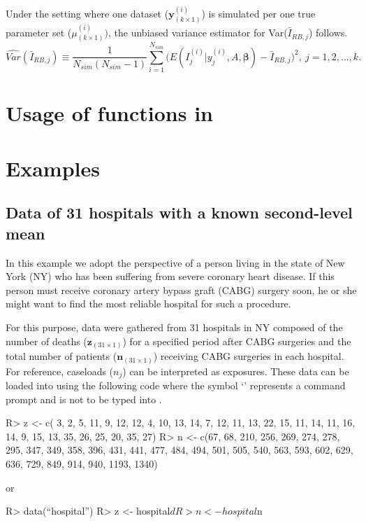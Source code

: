 \documentclass[article]{jss}
\begin{document}
Under the setting where one dataset ($\boldsymbol{y}^{(i)}_{(k\times1)}$) is simulated per one true parameter set ({\boldmath $\mu$}$^{(i)}_{(k\times1)})$, the unbiased variance estimator for Var($\bar{I}_{RB, j}$) follows.
\begin{equation}\label{RBvar}
\widehat{Var}(\bar{I}_{RB, j})\equiv\frac{1}{N_{sim}(N_{sim}-1)}\sum_{i=1}^{N_{sim}}\bigg(E(I^{(i)}_{j}\vert y^{(i)}_{j}, A, \boldsymbol{\beta})-\bar{I}_{RB, j}\bigg)^{2},~ j=1, 2, \ldots, k.
\end{equation}


\section[packageoverview]{Usage of functions in }\label{sec5}

\section[Examples]{Examples}\label{sec6}
\subsection[Known Second-level Mean]{Data of 31 hospitals with a known second-level mean}
\label{sec:ex:hosp}
In this example we adopt the perspective of a person living in the state of New York (NY) who has been suffering from severe coronary heart disease. If this person must receive coronary artery bypass graft (CABG) surgery soon, he or she might want to find the most reliable hospital for such a procedure.


For this purpose, data were gathered from 31 hospitals in NY composed of the number of deaths ($\textbf{z}_{(31\times1)}$) for a specified period after CABG surgeries and the total number of patients ($\textbf{n}_{(31\times1)}$) receiving CABG surgeries in each hospital. For reference, caseloads ($n_{j}$) can be interpreted as exposures. These data can be loaded into  using the following code where the symbol `' represents a command prompt and is not to be typed into .

\begin{CodeChunk}
\begin{CodeInput}
R> z <- c( 3,   2,   5,  11,   9,  12,  12,   4,  10,  13,  14,   7,  12,
          11,  13,  22,  15,  11,  14,  11,  16,  14,   9,  15,  13,  35,
          26,  25,  20,  35,  27)
R> n <- c(67,  68, 210, 256, 269, 274, 278, 295, 347, 349, 358, 396, 431,
         441, 477, 484, 494, 501, 505, 540, 563, 593, 602, 629, 636, 729,
         849, 914, 940, 1193, 1340)
\end{CodeInput}
\end{CodeChunk}
or
\begin{CodeChunk}
\begin{CodeInput}
R> data(``hospital'')
R> z <- hospital$d
R> n <- hospital$n
\end{CodeInput}
\end{CodeChunk}
\end{document}
